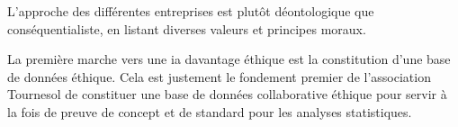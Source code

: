L'approche des différentes entreprises est plutôt déontologique que conséquentialiste, en listant diverses valeurs et principes moraux.


La première marche vers une \gls{ia} davantage éthique est la constitution d'une base de données éthique. Cela est justement le fondement premier de l'association Tournesol de constituer une base de données collaborative éthique pour servir à la fois de preuve de concept et de standard pour les analyses statistiques.
